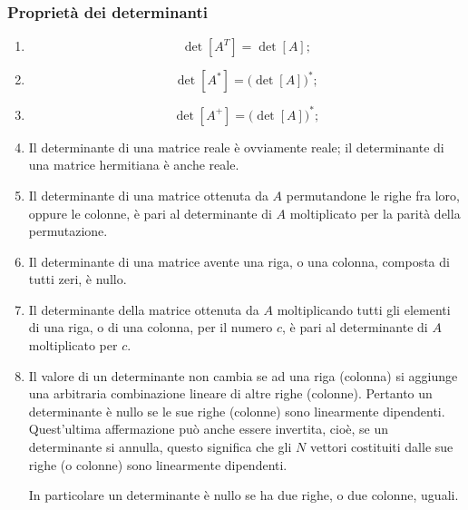 \documentclass[11pt, a4paper]{book}
\numberwithin{equation}{section}
\begin{document}
\subsubsection*{Proprietà dei determinanti}

\begin{enumerate}
\item
\begin{equation}
    \det[A^T] = \det[A];
    \tag{48}
\end{equation}

\item
\begin{equation}
    \det[A^*] = \bigl(\det[A]\bigr)^*;
    \tag{49}
\end{equation}

\item
\begin{equation}
    \det[A^+] = \bigl(\det[A]\bigr)^*;
    \tag{50}
\end{equation}

\item Il determinante di una matrice reale è ovviamente reale; il determinante di una matrice hermitiana è anche reale.

\item Il determinante di una matrice ottenuta da $A$ permutandone le righe fra loro, oppure le colonne, è pari al determinante di $A$ moltiplicato per la parità della permutazione.

\item Il determinante di una matrice avente una riga, o una colonna, composta di tutti zeri, è nullo.

\item Il determinante della matrice ottenuta da $A$ moltiplicando tutti gli elementi di una riga, o di una colonna, per il numero $c$, è pari al determinante di $A$ moltiplicato per $c$.

\item Il valore di un determinante non cambia se ad una riga (colonna) si aggiunge una arbitraria combinazione lineare di altre righe (colonne). Pertanto un determinante è nullo se le sue righe (colonne) sono linearmente dipendenti. Quest'ultima affermazione può anche essere invertita, cioè, se un determinante si annulla, questo significa che gli $N$ vettori costituiti dalle sue righe (o colonne) sono linearmente dipendenti.

In particolare un determinante è nullo se ha due righe, o due colonne, uguali.


\end{enumerate}
\end{document}

